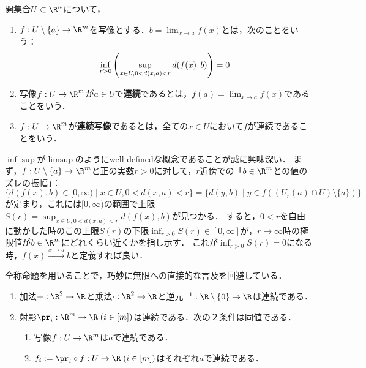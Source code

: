 \documentclass[uplatex,dvipdfmx]{jsreport}
\begin{document}
\begin{definition}
    開集合$U\subset \R^n$について，
    \begin{enumerate}
        \item $f:U\setminus\{a\}\to\R^m$を写像とする．$b=\lim_{x\to a}f(x)$とは，次のことをいう：
        \[ \inf_{r>0}\left(\sup_{x\in U,\\0<d(x,a)<r}d(f(x),b)\right)=0. \]
        \item 写像$f:U\to\R^m$が$a\in U$で\textbf{連続}であるとは，$f(a)=\lim_{x\to a}f(x)$であることをいう．
        \item $f:U\to\R^m$が\textbf{連続写像}であるとは，全ての$x\in U$において$f$が連続であることをいう．
    \end{enumerate}
\end{definition}
\begin{remark}
    $\inf\sup$が$\limsup$のようにwell-definedな概念であることが誠に興味深い．
    まず，$f:U\setminus\{a\}\to\R^m$と正の実数$r>0$に対して，$r$近傍での「$b\in\R^m$との値のズレの振幅」：
    \[ \{d(f(x),b)\in [0,\infty)\mid x\in U,0<d(x,a)<r\}=\{d(y,b)\mid y\in f((U_r(a)\cap U)\setminus\{a\})\} \]
    が定まり，これには$[0,\infty)$の範囲で上限$S(r)=\sup_{x\in U,0<d(x,a)<r}d(f(x),b)$が見つかる．
    すると，$0<r$を自由に動かした時のこの上限$S(r)$の下限$\inf_{r>0}S(r)\in[0,\infty]$が，$r\to\infty$時の極限値が$b\in\R^m$にどれくらい近くかを指し示す．
    これが$\inf_{r>0}S(r)=0$になる時，$f(x)\xrightarrow{x\to a}b$と定義すれば良い．

    全称命題を用いることで，巧妙に無限への直接的な言及を回避している．
\end{remark}

\begin{proposition}\mbox{}
    \begin{enumerate}
        \item 加法$+:\R^2\to\R$と乗法$\cdot:\R^2\to\R$と逆元${}^{-1}:\R\setminus\{0\}\to\R$は連続である．
        \item 射影$\pr_i:\R^m\to\R\;(i\in[m])$は連続である．次の２条件は同値である．
        \begin{enumerate}[(1)]
            \item 写像$f:U\to\R^m$は$a$で連続である．
            \item $f_i:=\pr_i\circ f:U\to\R\;(i\in[m])$はそれぞれ$a$で連続である．
        \end{enumerate}
    \end{enumerate}
\end{proposition}
\end{document}
